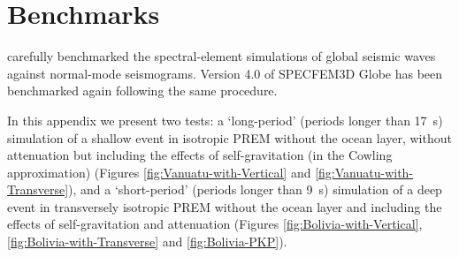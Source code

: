 \chapter{Benchmarks}

\citet{KoTr02a,KoTr02b} carefully benchmarked the spectral-element
simulations of global seismic waves against normal-mode seismograms.
Version 4.0 of SPECFEM3D Globe has been benchmarked again
following the same procedure.\newline


In this appendix we present two tests: a `long-period' (periods longer
than 17~s) simulation of a shallow event in isotropic PREM \citep{DzAn81}
without the ocean layer, without attenuation but including the effects
of self-gravitation (in the Cowling approximation) (Figures \ref{fig:Vanuatu-with-Vertical}
and \ref{fig:Vanuatu-with-Transverse}), and a `short-period' (periods
longer than 9~s) simulation of a deep event in transversely isotropic
PREM without the ocean layer and including the effects of self-gravitation
and attenuation (Figures \ref{fig:Bolivia-with-Vertical}, \ref{fig:Bolivia-with-Transverse}
and \ref{fig:Bolivia-PKP}).

